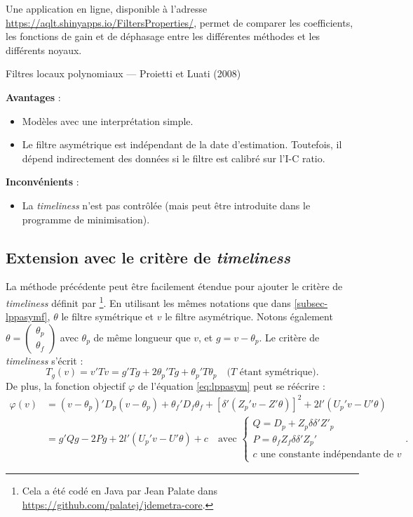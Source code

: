 \documentclass[
  11pt,
  french,
  a4paper]{article}
\providecommand{\tightlist}{%
  \setlength{\itemsep}{0pt}\setlength{\parskip}{0pt}}
\newcommand\1{\mathds{1}}
\begin{document}
Une application en ligne, disponible à l'adresse \url{https://aqlt.shinyapps.io/FiltersProperties/}, permet de comparer les coefficients, les fonctions de gain et de déphasage entre les différentes méthodes et les différents noyaux.

\begin{summary_box}{Filtres locaux polynomiaux --- Proietti et Luati (2008)}

\textbf{Avantages} :

\begin{itemize}
\item
  Modèles avec une interprétation simple.
\item
  Le filtre asymétrique est indépendant de la date d'estimation.
  Toutefois, il dépend indirectement des données si le filtre est calibré sur l'I-C ratio.
\end{itemize}

\textbf{Inconvénients} :

\begin{itemize}
\tightlist
\item
  La \emph{timeliness} n'est pas contrôlée (mais peut être introduite dans le programme de minimisation).
\end{itemize}

\end{summary_box}

\hypertarget{subsec-lptimeliness}{%
\subsection{\texorpdfstring{Extension avec le critère de \emph{timeliness}}{Extension avec le critère de timeliness}}\label{subsec-lptimeliness}}

La méthode précédente peut être facilement étendue pour ajouter le critère de \emph{timeliness} définit par \textcite{ch15HBSA}\footnote{Cela a été codé en Java par Jean Palate dans \url{https://github.com/palatej/jdemetra-core}.}.
En utilisant les mêmes notations que dans \ref{subsec-lppasymf}, \(\theta\) le filtre symétrique et \(v\) le filtre asymétrique.
Notons également \(\theta=\begin{pmatrix}\theta_p\\\theta_f\end{pmatrix}\) avec \(\theta_p\) de même longueur que \(v\), et \(g=v-\theta_p\).
Le critère de \emph{timeliness} s'écrit :
\[
T_g(v)=v'Tv=g'Tg+2\theta_p'Tg+\theta_p'T\theta_p
\quad(T\text{ étant symétrique)}.
\]
De plus, la fonction objectif \(\varphi\) de l'équation \eqref{eq:lppasym} peut se réécrire :
\begin{align*}
\varphi(v)&=(v-\theta_p)'D_{p}(v-\theta_p)+
  \theta_f'D_{f}\theta_f+
  [\delta'(Z_{p}'v-Z'\theta)]^{2}+
2l'(U_{p}'v-U'\theta)\\
&=g'Qg-2Pg+2l'(U_{p}'v-U'\theta)+c\quad\text{avec }
\begin{cases}
Q=D_p+Z_p\delta\delta'Z'_p \\
P=\theta_fZ_f\delta\delta'Z_p'\\
c\text{ une constante indépendante de }v
\end{cases}.
\end{align*}
\end{document}
